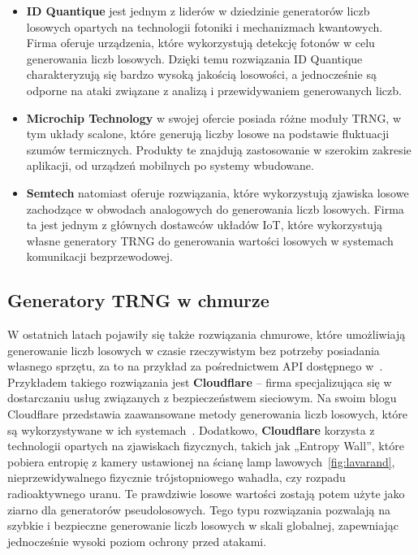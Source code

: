 \begin{itemize}
    \item \textbf{ID Quantique} jest jednym z liderów w dziedzinie generatorów liczb losowych opartych na technologii fotoniki i mechanizmach kwantowych.
     Firma oferuje urządzenia, które wykorzystują detekcję fotonów w celu generowania liczb losowych.
     Dzięki temu rozwiązania ID Quantique charakteryzują się bardzo wysoką jakością losowości,
     a jednocześnie są odporne na ataki związane z analizą i przewidywaniem generowanych liczb.

    \item \textbf{Microchip Technology} w swojej ofercie posiada różne moduły TRNG, w tym układy scalone,
     które generują liczby losowe na podstawie fluktuacji szumów termicznych.
    Produkty te znajdują zastosowanie w szerokim zakresie aplikacji, od urządzeń mobilnych po systemy wbudowane.

    \item \textbf{Semtech} natomiast oferuje rozwiązania, które wykorzystują zjawiska losowe
     zachodzące w obwodach analogowych do generowania liczb losowych.
     Firma ta jest jednym z głównych dostawców układów IoT, które wykorzystują własne generatory TRNG
     do generowania wartości losowych w systemach komunikacji bezprzewodowej.
\end{itemize}

\subsection{Generatory TRNG w chmurze}\label{subsec:generatory-trng-w-chmurze}

W ostatnich latach pojawiły się także rozwiązania chmurowe, które umożliwiają generowanie liczb losowych w czasie rzeczywistym bez potrzeby posiadania własnego sprzętu,
za to na przykład za pośrednictwem API dostępnego w~\cite{drand_documentation}.
Przykładem takiego rozwiązania jest \textbf{Cloudflare} – firma specjalizująca się w dostarczaniu usług związanych z bezpieczeństwem sieciowym.
Na swoim blogu Cloudflare przedstawia zaawansowane metody generowania liczb losowych, które są wykorzystywane w ich systemach~\cite{cloudflare_league_of_entropy}.
Dodatkowo, \textbf{Cloudflare} korzysta z technologii opartych na zjawiskach fizycznych, takich jak „Entropy Wall”, które pobiera entropię z kamery
ustawionej na ścianę lamp lawowych~\ref{fig:lavarand}, nieprzewidywalnego fizycznie trójstopniowego wahadła, czy rozpadu radioaktywnego uranu.
Te prawdziwie losowe wartości zostają potem użyte jako ziarno dla generatorów pseudolosowych.
Tego typu rozwiązania pozwalają na szybkie i bezpieczne generowanie liczb losowych w skali globalnej, zapewniając jednocześnie wysoki poziom ochrony przed atakami.

